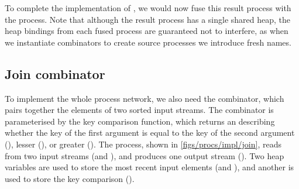 To complete the implementation of \lstiproc@priceOverTime@, we would now fuse this result process with the \lstiproc@correlation@ process.
Note that although the result process has a single shared heap, the heap bindings from each fused process are guaranteed not to interfere, as when we instantiate combinators to create source processes we introduce fresh names. 


\subsection{Join combinator}

To implement the whole \lstiproc@priceAnalyses@ process network, we also need the \lstiproc@join@ combinator, which pairs together the elements of two sorted input streams.
The combinator is parameterised by the key comparison function, which returns an \lstiproc@Ordering@ describing whether the key of the first argument is equal to the key of the second argument (\lstiproc@EQ@), lesser (\lstiproc@LT@), or greater (\lstiproc@GT@).
The process, shown in \cref{figs/procs/impl/join}, reads from two input streams (\lstiproc@sA@ and \lstiproc@sB@), and produces one output stream (\lstiproc@sOut@).
Two heap variables are used to store the most recent input elements (\lstiproc@va@ and \lstiproc@vb@), and another is used to store the key comparison (\lstiproc@c@).

